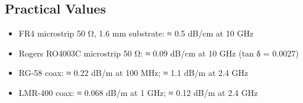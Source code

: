 				

				

\subsection{Practical Values}

				
\begin{itemize}

					\item FR4 microstrip 50 Ω, 1.6 mm substrate: ≈ 0.5 dB/cm at 10 GHz

					\item Rogers RO4003C microstrip 50 Ω: ≈ 0.09 dB/cm at 10 GHz (tan δ = 0.0027)

					\item RG-58 coax: ≈ 0.22 dB/m at 100 MHz; ≈ 1.1 dB/m at 2.4 GHz

					\item LMR-400 coax: ≈ 0.068 dB/m at 1 GHz; ≈ 0.12 dB/m at 2.4 GHz

				
\end{itemize}



